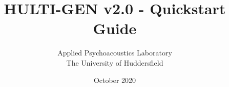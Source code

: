 \documentclass[oneside, a4paper,12pt]{book}
\begin{document}
\author{Applied Psychoacoustics Laboratory \\ The University of Huddersfield}
\title{HULTI-GEN v2.0 - Quickstart Guide}
\date{October 2020}

\maketitle
\cleardoublepage
\tableofcontents




\end{document}
